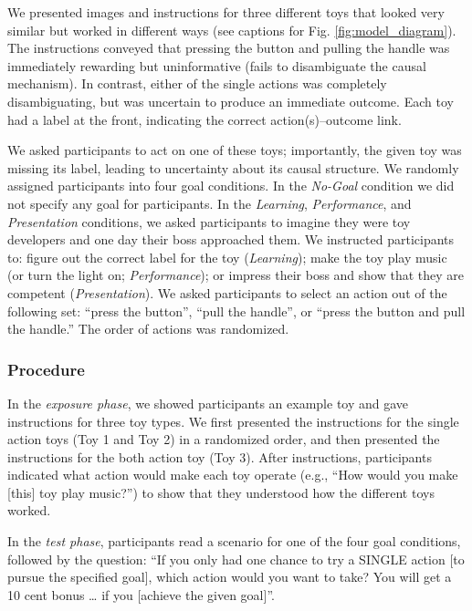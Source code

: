 \documentclass[10pt, letterpaper]{article}
\begin{document}
We presented images and instructions for three different toys that
looked very similar but worked in different ways (see captions for Fig.
\ref{fig:model_diagram}). The instructions conveyed that pressing the
button and pulling the handle was immediately rewarding but
uninformative (fails to disambiguate the causal mechanism). In contrast,
either of the single actions was completely disambiguating, but was
uncertain to produce an immediate outcome. Each toy had a label at the
front, indicating the correct action(s)--outcome link.

We asked participants to act on one of these toys; importantly, the
given toy was missing its label, leading to uncertainty about its causal
structure. We randomly assigned participants into four goal conditions.
In the \emph{No-Goal} condition we did not specify any goal for
participants. In the \emph{Learning}, \emph{Performance}, and
\emph{Presentation} conditions, we asked participants to imagine they
were toy developers and one day their boss approached them. We
instructed participants to: figure out the correct label for the toy
(\emph{Learning}); make the toy play music (or turn the light on;
\emph{Performance}); or impress their boss and show that they are
competent (\emph{Presentation}). We asked participants to select an
action out of the following set: ``press the button'', ``pull the
handle'', or ``press the button and pull the handle.'' The order of
actions was randomized.

\subsubsection{Procedure}\label{procedure}

In the \emph{exposure phase}, we showed participants an example toy and
gave instructions for three toy types. We first presented the
instructions for the single action toys (Toy 1 and Toy 2) in a
randomized order, and then presented the instructions for the both
action toy (Toy 3). After instructions, participants indicated what
action would make each toy operate (e.g., ``How would you make
{[}this{]} toy play music?'') to show that they understood how the
different toys worked.

In the \emph{test phase}, participants read a scenario for one of the
four goal conditions, followed by the question: ``If you only had one
chance to try a SINGLE action {[}to pursue the specified goal{]}, which
action would you want to take? You will get a 10 cent bonus \ldots{} if
you {[}achieve the given goal{]}''.
\end{document}
